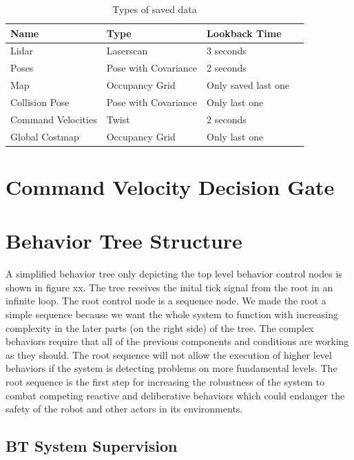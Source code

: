 \begin{table}[h!]
	\caption{Types of saved data}
	\begin{tabular}{ | m{} | m{}| m{} | m{} |} 
  	\hline
  	Name & Type & Lookback Time \\ 
  	\hline
  	Lidar & Laserscan & 3 seconds \\
  	\hline
  	Poses & Pose with Covariance & 2 seconds\\ 
  	\hline
  	Map & Occupancy Grid & Only saved last one \\ 
  	\hline
  	Collision Pose & Pose with Covariance & Only last one \\
  	\hline
  	Command Velocities & Twist & 2 seconds\\
  	\hline  	
  	Global Costmap & Occupancy Grid & Only last one \\
  	\hline
	\end{tabular}
\end{table}

\section{Command Velocity Decision Gate}


\section{Behavior Tree Structure}

A simplified behavior tree only depicting the top level behavior control nodes is shown in figure xx. The tree receives the inital tick signal from the root in an infinite loop. The root control node is a sequence node. We made the root a simple sequence because we want the whole system to function with increasing complexity in the later parts (on the right side) of the tree. The complex behaviors require that all of the previous components and conditions are working as they should. The root sequence will not allow the execution of higher level behaviors if the system is detecting problems on more fundamental levels. The root sequence is the first step for increasing the robustness of the system to combat competing reactive and deliberative behaviors which could endanger the safety of the robot and other actors in its environments. 

\subsection{BT System Supervision}

